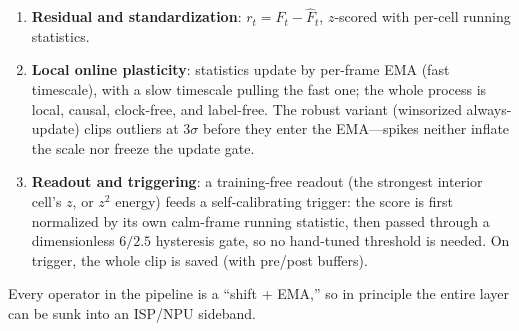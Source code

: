 \documentclass[12pt,a4paper]{article}
\begin{document}
\begin{enumerate}
  The physics of Eq.~(1) is the small-angle, pure-rotation pinhole relation. $g_t$ is an \emph{angular rate} in deg/s, so $g_t/\mathrm{fps}$ is the rotation angle swept during one inter-frame interval $1/\mathrm{fps}$; $\mathrm{radians}(\cdot)$ only changes units to rad. Under a pinhole camera a rotation $\theta$ moves the image of a distant point by $f\tan\theta$ pixels, where $f$ is the focal length in pixels---this is exactly the plane-at-infinity image shift, and it is \emph{depth-independent}, which is what makes the rotation term the only component a pure gyro copy can predict. $f_{\mathrm{map}} = (W/2)/\tan(\mathrm{fov}/2)\cdot(\text{map width}/W)$ is that focal length expressed in feature-map pixels rather than input pixels, i.e.\ scaled by the backbone's stride-8 downsampling. Two consequences matter downstream: (i)~$\tan\theta \approx \theta$ holds to within 0.1\% up to about $2^\circ$, so for the 30-fps regime the relation is essentially linear in the gyro reading; (ii)~because $f_{\mathrm{map}}$ scales with the feature map's width, the number of map pixels a given rotation buys grows linearly with input resolution---which is precisely the mechanism behind the resolution sweep of Section~\ref{sec:resolution}. Translation and roll are \emph{not} expressible in Eq.~(1) (translation needs depth, roll is a rotation about the optical axis, not a 2D shift), and Section~\ref{sec:negatives} measures the cost of that omission.
  \item \textbf{Residual and standardization}: $r_t = F_t - \hat F_t$, $z$-scored with per-cell running statistics.
  \item \textbf{Local online plasticity}: statistics update by per-frame EMA (fast timescale), with a slow timescale pulling the fast one; the whole process is local, causal, clock-free, and label-free. The robust variant (winsorized always-update) clips outliers at $3\sigma$ before they enter the EMA---spikes neither inflate the scale nor freeze the update gate.
  \item \textbf{Readout and triggering}: a training-free readout (the strongest interior cell's $z$, or $z^2$ energy) feeds a self-calibrating trigger: the score is first normalized by its own calm-frame running statistic, then passed through a dimensionless $6/2.5$ hysteresis gate, so no hand-tuned threshold is needed. On trigger, the whole clip is saved (with pre/post buffers).
\end{enumerate}

Every operator in the pipeline is a ``shift + EMA,'' so in principle the entire layer can be sunk into an ISP/NPU sideband.
\end{document}
